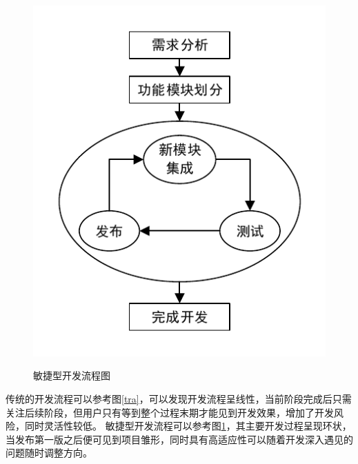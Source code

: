     \begin{figure}[h]
        \centering
        \includegraphics{../pdf/agile.pdf}\\
        \caption{敏捷型开发流程图}
        \label{agi}
    \end{figure}
    传统的开发流程可以参考图\ref{tra}，可以发现开发流程呈线性，当前阶段完成后只需关注后续阶段，但用户只有等到整个过程末期才能见到开发效果，增加了开发风险，同时灵活性较低。
    敏捷型开发流程可以参考图\ref{agi}，其主要开发过程呈现环状，当发布第一版之后便可见到项目雏形，同时具有高适应性可以随着开发深入遇见的问题随时调整方向。

